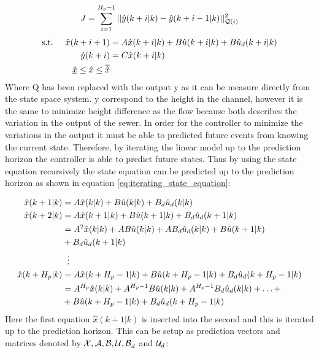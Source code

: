 \begin{equation}
	 J = \sum_{i=1}^{H_p-1} || \hat{y}(k+i|k)-\hat{y}(k+i-1|k)||_{\CMcal{Q}(i)}^2
\end{equation}
\begin{equation}
	\begin{aligned}
	\text{s.t.} \hspace{5mm}  \hat{x}(k+i+1) &= A\hat{x}(k+i|k)+B\hat{u}(k+i|k)+B\hat{u}_d(k+i|k) \\
						      \hat{y}(k+i)&= C\hat{x}(k+i|k) \\
						     \underline{\hat{x}} \leq \hat{x} \leq \overline{\hat{x}}
	\end{aligned}
\end{equation}
Where Q has been replaced with the output y as it can be measure directly from the state space system. y correspond to the height in the channel, however it is the same to minimize height difference as the flow because both describes the variation in the output of the sewer. In order for the controller to minimize the variations in the output it must be able to predicted future events from knowing the current state. Therefore, by iterating the linear model up to the prediction horizon the controller is able to predict future states. Thus by using the state equation recursively the state equation can be predicted up to the prediction horizon as shown in equation \ref{eq:iterating_state_equation}: 

\begin{equation}\label{eq:iterating_state_equation}
\begin{aligned}
	\hat{x}(k+1|k) &= A\hat{x}(k|k)+B\hat{u}(k|k) + B_d\hat{u}_d(k|k)\\
	\hat{x}(k+2|k) &= A\hat{x}(k+1|k)+B\hat{u}(k+1|k)+ B_d\hat{u}_d(k+1|k) \\
				   &= A^2\hat{x}(k|k)+AB\hat{u}(k|k)+AB_d\hat{u}_d(k|k) + B\hat{u}(k+1|k) \\
				   &+ B_d\hat{u}_d(k+1|k) \\
				   &\hspace{2mm}\vdots\\
   \hat{x}(k+H_p|k)&= A\hat{x}(k+H_p-1|k)+B\hat{u}(k+H_p-1|k)+B_d\hat{u}_d(k+H_p-1|k)\\
   				   &= A^{H_p}\hat{x}(k|k)+A^{H_p-1}B\hat{u}(k|k)+A^{H_p-1}B_d\hat{u}_d(k|k)+\hdots+\\
   				   &+B\hat{u}(k+H_p-1|k)+B_d\hat{u}_d(k+H_p-1|k)
\end{aligned}
\end{equation}
Here the first equation $\hat{x}(k+1|k)$ is inserted into the second and this is iterated up to the prediction horizon. This can be setup as prediction vectors and matrices denoted by $\CMcal{X,A,B,U,B}_d$ and $\CMcal{U}_d$:


